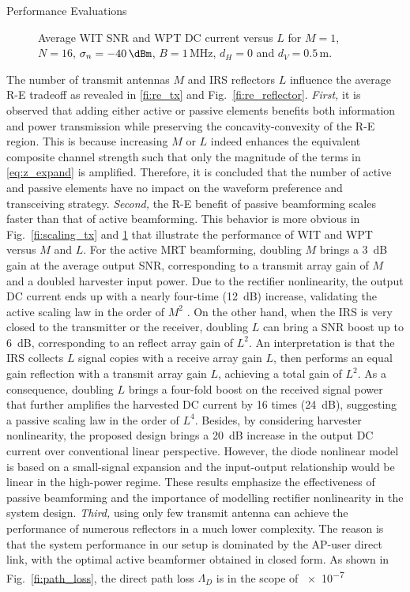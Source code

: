 \documentclass[journal]{IEEEtran}
\begin{document}
\begin{section}{Performance Evaluations}
		\begin{figure}[!t]
			\centering
			\begin{adjustbox}{width=\linewidth}
				
			\end{adjustbox}
			\caption{Average WIT SNR and WPT DC current versus $L$ for $M=1$, $N=16$, $\sigma_n=-40\,\si{\dBm}$, $B=1\,\si{\MHz}$, $d_H=0$ and $d_V=0.5\,\si{\meter}$.}
			\label{fi:scaling_reflector}
		\end{figure}

		The number of transmit antennas $M$ and IRS reflectors $L$ influence the average R-E tradeoff as revealed in \ref{fi:re_tx} and Fig.~\ref{fi:re_reflector}. \textit{First,} it is observed that adding either active or passive elements benefits both information and power transmission while preserving the concavity-convexity of the R-E region. This is because increasing $M$ or $L$ indeed enhances the equivalent composite channel strength such that only the magnitude of the terms in \ref{eq:z_expand} is amplified. Therefore, it is concluded that the number of active and passive elements have no impact on the waveform preference and transceiving strategy. \textit{Second,} the R-E benefit of passive beamforming scales faster than that of active beamforming. This behavior is more obvious in Fig.~\ref{fi:scaling_tx} and \ref{fi:scaling_reflector} that illustrate the performance of WIT and WPT versus $M$ and $L$. For the active MRT beamforming, doubling $M$ brings a \SI{3}{\dB} gain at the average output SNR, corresponding to a transmit array gain of $M$ and a doubled harvester input power. Due to the rectifier nonlinearity, the output DC current ends up with a nearly four-time (\SI{12}{\dB}) increase, validating the active scaling law in the order of $M^2$ \cite{Clerckx2016a}. On the other hand, when the IRS is very closed to the transmitter or the receiver, doubling $L$ can bring a SNR boost up to \SI{6}{\dB}, corresponding to an reflect array gain of $L^2$. An interpretation is that the IRS collects $L$ signal copies with a receive array gain $L$, then performs an equal gain reflection with a transmit array gain $L$, achieving a total gain of $L^2$. As a consequence, doubling $L$ brings a four-fold boost on the received signal power that further amplifies the harvested DC current by 16 times (\SI{24}{\dB}), suggesting a passive scaling law in the order of $L^4$. Besides, by considering harvester nonlinearity, the proposed design brings a \SI{20}{\dB} increase in the output DC current over conventional linear perspective. However, the diode nonlinear model is based on a small-signal expansion and the input-output relationship would be linear in the high-power regime. These results emphasize the effectiveness of passive beamforming and the importance of modelling rectifier nonlinearity in the system design. \textit{Third,} using only few transmit antenna can achieve the performance of numerous reflectors in a much lower complexity. The reason is that the system performance in our setup is dominated by the AP-user direct link, with the optimal active beamformer obtained in closed form. As shown in Fig.~\ref{fi:path_loss}, the direct path loss $\Lambda_D$ is in the scope of \num{e-7} 
\end{section}
\end{document}
